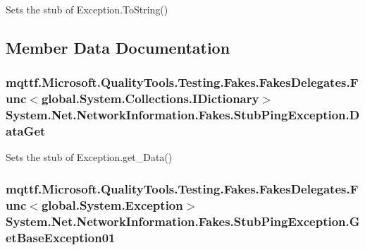 Sets the stub of Exception.\-To\-String()



\subsection{Member Data Documentation}
\hypertarget{class_system_1_1_net_1_1_network_information_1_1_fakes_1_1_stub_ping_exception_a18013fef6476b8fa7c582190e14412c9}{
\subsubsection[{Data\-Get}]{\setlength{\rightskip}{0pt plus 5cm}mqttf.\-Microsoft.\-Quality\-Tools.\-Testing.\-Fakes.\-Fakes\-Delegates.\-Func$<$global.\-System.\-Collections.\-I\-Dictionary$>$ System.\-Net.\-Network\-Information.\-Fakes.\-Stub\-Ping\-Exception.\-Data\-Get}}\label{class_system_1_1_net_1_1_network_information_1_1_fakes_1_1_stub_ping_exception_a18013fef6476b8fa7c582190e14412c9}


Sets the stub of Exception.\-get\-\_\-\-Data()

\hypertarget{class_system_1_1_net_1_1_network_information_1_1_fakes_1_1_stub_ping_exception_aad1290aeb7899b26aa104f25012d9426}{
\subsubsection[{Get\-Base\-Exception01}]{\setlength{\rightskip}{0pt plus 5cm}mqttf.\-Microsoft.\-Quality\-Tools.\-Testing.\-Fakes.\-Fakes\-Delegates.\-Func$<$global.\-System.\-Exception$>$ System.\-Net.\-Network\-Information.\-Fakes.\-Stub\-Ping\-Exception.\-Get\-Base\-Exception01}}\label{class_system_1_1_net_1_1_network_information_1_1_fakes_1_1_stub_ping_exception_aad1290aeb7899b26aa104f25012d9426}


